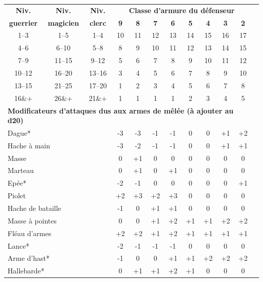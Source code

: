 \documentclass[11pt]{article}
\begin{document}
{\begin{tabular}{cccccccccccc}
\textbf{Niv. } & \textbf{Niv.} & \textbf{Niv.} & \multicolumn{8}{c}{\textbf{Classe d'armure du défenseur}} \\
\textbf{guerrier}   & \textbf{magicien}   & \textbf{clerc}   & \textbf{9} & \textbf{8} & \textbf{7} & \textbf{6} & \textbf{5} & \textbf{4} & \textbf{3} & \textbf{2} \\
1--3   & 1--5   & 1--4   & 10 & 11 & 12 & 13 & 14 & 15 & 16 & 17 \\
4--6   & 6--10  & 5--8   &  8 &  9 & 10 & 11 & 12 & 13 & 14 & 15 \\
7--9   & 11--15 & 9--12  &  5 &  6 &  7 &  8 &  9 & 10 & 11 & 12 \\
10--12 & 16--20 & 13--16 &  3 &  4 &  5 &  6 &  7 &  8 &  9 & 10 \\
13--15 & 21--25 & 17--20 &  1 &  2 &  3 &  4 &  5 &  6 &  7 &  8 \\
16\&+  & 26\&+  & 21\&+  &  1 &  1 &  1 &  1 &  2 &  3 &  4 &  5 \\
\multicolumn{11}{l}{\textbf{Modificateurs d'attaques dus aux armes de mêlée (à ajouter au d20)}} \\
\multicolumn{3}{l}{Dague*}            & -3 & -3 & -1 & -1 &  0 &  0 & +1 & +2 \\
\multicolumn{3}{l}{Hache à main}      & -3 & -2 & -1 & -1 &  0 &  0 & +1 & +1 \\
\multicolumn{3}{l}{Masse}             &  0 & +1 &  0 &  0 &  0 &  0 &  0 &  0 \\
\multicolumn{3}{l}{Marteau}           &  0 & +1 &  0 & +1 &  0 &  0 &  0 &  0 \\
\multicolumn{3}{l}{Epée*}             & -2 & -1 &  0 &  0 &  0 &  0 &  0 & +1 \\
\multicolumn{3}{l}{Piolet}            & +2 & +3 & +2 & +3 &  0 &  0 &  0 &  0 \\
\multicolumn{3}{l}{Hache de bataille} & -1 &  0 & +1 & +1 &  0 &  0 &  0 &  0 \\
\multicolumn{3}{l}{Masse à pointes}   &  0 &  0 & +1 & +2 & +1 & +1 & +2 & +2 \\
\multicolumn{3}{l}{Fléau d'armes}     & +2 & +2 & +1 & +2 & +1 & +1 & +1 & +1 \\
\multicolumn{3}{l}{Lance*}            & -2 & -1 & -1 & -1 &  0 &  0 &  0 &  0 \\
\multicolumn{3}{l}{Arme d'hast*}      & -1 &  0 &  0 & +1 & +1 & +2 & +2 & +2 \\
\multicolumn{3}{l}{Hallebarde*}       &  0 & +1 & +1 & +2 & +1 &  0 &  0 &  0 \\

\end{tabular}}
\end{document}
